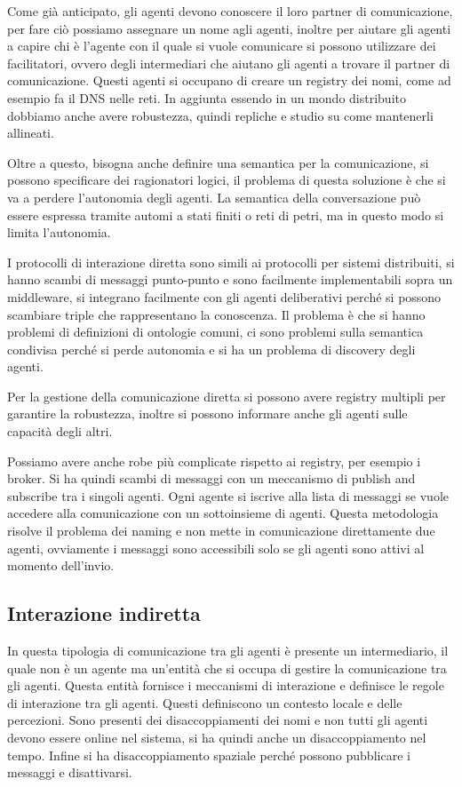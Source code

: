 Come già anticipato, gli agenti devono conoscere il loro partner di comunicazione,
per fare ciò possiamo assegnare un nome agli agenti, inoltre per aiutare gli
agenti a capire chi è l'agente con il quale si vuole comunicare si possono
utilizzare dei facilitatori, ovvero degli intermediari che aiutano gli agenti
a trovare il partner di comunicazione. Questi agenti si occupano di creare un
registry dei nomi, come ad esempio fa il DNS nelle reti. In aggiunta essendo in
un mondo distribuito dobbiamo anche avere robustezza, quindi repliche e studio
su come mantenerli allineati.

Oltre a questo, bisogna anche definire una semantica per la comunicazione, si
possono specificare dei ragionatori logici, il problema di questa soluzione è
che si va a perdere l'autonomia degli agenti. La semantica della conversazione può essere espressa tramite automi a stati finiti
o reti di petri, ma in questo modo si limita l'autonomia.

I protocolli di interazione diretta sono simili ai protocolli per sistemi distribuiti,
si hanno scambi di messaggi punto-punto e sono facilmente implementabili sopra
un middleware, si integrano facilmente con gli agenti deliberativi perché si possono
scambiare triple che rappresentano la conoscenza. Il problema è che si hanno problemi di definizioni di ontologie
comuni, ci sono problemi sulla semantica condivisa perché si perde autonomia e si ha un
problema di discovery degli agenti.

Per la gestione della comunicazione diretta si possono avere registry multipli
per garantire la robustezza, inoltre si possono informare anche gli agenti sulle
capacità degli altri.

Possiamo avere anche robe più complicate rispetto ai registry, per esempio i broker.
Si ha quindi scambi di messaggi con un meccanismo di publish and subscribe tra
i singoli agenti. Ogni agente si iscrive alla lista di messaggi se vuole accedere
alla comunicazione con un sottoinsieme di agenti. Questa metodologia risolve il
problema dei naming e non mette in comunicazione direttamente due agenti,
ovviamente i messaggi sono accessibili solo se gli agenti sono attivi al momento
dell'invio.
\subsection{Interazione indiretta}
In questa tipologia di comunicazione tra gli agenti è presente un intermediario,
il quale non è un agente ma un'entità che si occupa di gestire la comunicazione
tra gli agenti. Questa entità fornisce i meccanismi di interazione e
definisce le regole di interazione tra gli agenti. Questi definiscono un
contesto locale e delle percezioni. Sono presenti dei disaccoppiamenti
dei nomi e non tutti gli agenti devono essere online nel sistema, si ha quindi
anche un disaccoppiamento nel tempo. Infine si ha disaccoppiamento spaziale
perché possono pubblicare i messaggi e disattivarsi.
